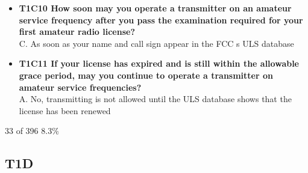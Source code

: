 \documentclass[10pt]{beamer}
\begin{document}
\begin{frame}
\begin{itemize}[<+->]
\item\textbf{T1C10 How soon may you operate a transmitter on an amateur service frequency after you pass the examination required for your first amateur radio license?} \hfil\\C. As soon as your name and call sign appear in the FCC s ULS database
\item\textbf{T1C11 If your license has expired and is still within the allowable grace period, may you continue to operate a transmitter on amateur service frequencies?} \hfil\\A. No, transmitting is not allowed until the ULS database shows that the license has been renewed
\end{itemize}
\tiny 33 of 396 8.3\%
\end{frame}
\subsection{T1D}
\end{document}
